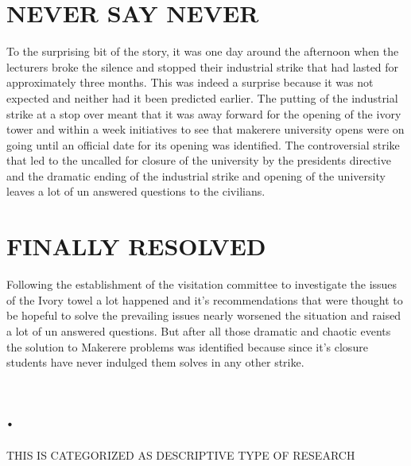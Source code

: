 \documentclass[12pt]{article}
\begin{document}
	\section{NEVER SAY NEVER}
	To the surprising bit of the story, it was one day around the afternoon
	when the lecturers broke the silence and stopped their industrial
	strike that had lasted for approximately three months. This was
	indeed a surprise because it was not expected and neither had it
	been predicted earlier.
	The putting of the industrial strike at a stop over meant that it was
	away forward for the opening of the ivory tower and within a week
	initiatives to see that makerere university opens were on going until
	an official date for its opening was identified.
	The controversial strike that led to the uncalled for closure of the university by the presidents directive and the
	dramatic ending of the industrial strike and opening of the university
	leaves a lot of un answered questions to the civilians.
	
		\section{FINALLY RESOLVED}
	Following the establishment of the visitation committee to investigate the issues of the Ivory towel a lot happened and it's recommendations that were thought to be hopeful to solve the prevailing issues nearly worsened the situation and raised a lot of un answered questions.
	But after all those dramatic and chaotic events the solution to Makerere problems was identified because since it's closure students have never indulged them solves in any other strike.
		\section{.}
		THIS IS CATEGORIZED AS DESCRIPTIVE TYPE OF RESEARCH
\end{document}
